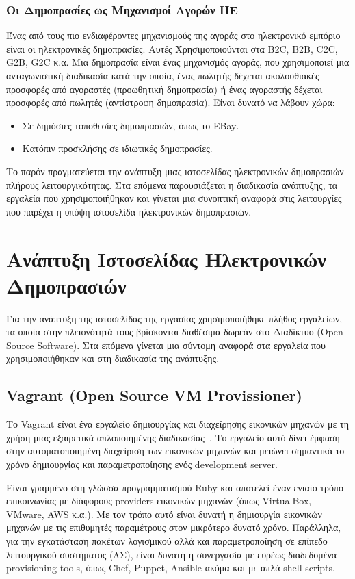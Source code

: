 \documentclass[12pt]{report}
\begin{document}
\subsection{Οι Δημοπρασίες ως Μηχανισμοί Αγορών ΗΕ}
Ένας από τους πιο ενδιαφέροντες μηχανισμούς της αγοράς στο ηλεκτρονικό εμπόριο είναι οι ηλεκτρονικές δημοπρασίες. Αυτές Χρησιμοποιούνται στα \textlatin{B2C, B2B, C2C, G2B, G2C} κ.α. Μια δημοπρασία είναι ένας μηχανισμός αγοράς, που χρησιμοποιεί μια ανταγωνιστική διαδικασία κατά την οποία, ένας πωλητής δέχεται ακολουθιακές προσφορές από αγοραστές (προωθητική δημοπρασία) ή ένας αγοραστής δέχεται προσφορές από πωλητές (αντίστροφη δημοπρασία). Είναι δυνατό να λάβουν χώρα:
\begin{itemize}
  \item Σε δημόσιες τοποθεσίες δημοπρασιών, όπως το \textlatin{EBay}.
  \item Κατόπιν προσκλήσης σε ιδιωτικές δημοπρασίες.
\end{itemize}

Το παρόν πραγματεύεται την ανάπτυξη μιας ιστοσελίδας ηλεκτρονικών δημοπρασιών πλήρους λειτουργικότητας. Στα επόμενα παρουσιάζεται η διαδικασία ανάπτυξης, τα εργαλεία που χρησιμοποιήθηκαν και γίνεται μια συνοπτική αναφορά στις λειτουργίες που παρέχει η υπόψη ιστοσελίδα ηλεκτρονικών δημοπρασιών.

\chapter{Ανάπτυξη Ιστοσελίδας Ηλεκτρονικών Δημοπρασιών}\label{ch2}
Για την ανάπτυξη της ιστοσελίδας της εργασίας χρησιμοποιήθηκε πλήθος εργαλείων, τα οποία στην πλειονότητά τους βρίσκονται διαθέσιμα δωρεάν στο Διαδίκτυο (\textlatin{Open Source Software}). Στα επόμενα γίνεται μια σύντομη αναφορά στα εργαλεία που χρησιμοποιήθηκαν και στη διαδικασία της ανάπτυξης.

\section{\textlatin{\textlatin{Vagrant (Open Source VM Provissioner)}}}\label{vagrant}
Το \textlatin{Vagrant} είναι ένα εργαλείο δημιουργίας και διαχείρησης εικονικών μηχανών με τη χρήση μιας εξαιρετικά απλοποιημένης διαδικασίας~\cite{vagrant_by_hashicorp}. Το εργαλείο αυτό δίνει έμφαση στην αυτοματοποιημένη διαχείριση των εικονικών μηχανών και μειώνει σημαντικά το χρόνο δημιουργίας και παραμετροποίησης ενός \textlatin{development server}.

Είναι γραμμένο στη γλώσσα προγραμματισμού \textlatin{Ruby} και αποτελεί έναν ενιαίο τρόπο επικοινωνίας με δίάφορους \textlatin{providers} εικονικών μηχανών (όπως \textlatin{VirtualBox, VMware, AWS} κ.α.). Με τον τρόπο αυτό είναι δυνατή η δημιουργία εικονικών μηχανών με τις επιθυμητές παραμέτρους στον μικρότερο δυνατό χρόνο. Παράλληλα, για την εγκατάσταση πακέτων λογισμικού αλλά και παραμετροποίηση σε επίπεδο λειτουργικού συστήματος (ΛΣ), είναι δυνατή η συνεργασία με ευρέως διαδεδομένα \textlatin{provisioning tools}, όπως \textlatin{Chef, Puppet, Ansible} ακόμα και με απλά \textlatin{shell scripts}.
\end{document}
